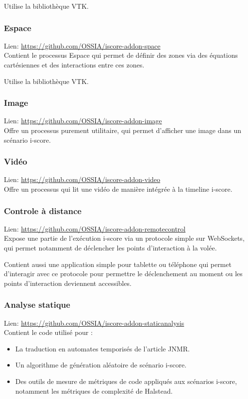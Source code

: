 \documentclass[french,a4paper,openany,12pt]{book}
\begin{document}
Utilise la bibliothèque VTK.

\subsubsection{Espace}
Lien: \url{https://github.com/OSSIA/iscore-addon-space}~\\
Contient le processus Espace qui permet de définir des zones via 
des équations cartésiennes et des interactions entre ces zones.

Utilise la bibliothèque VTK.

\subsubsection{Image}
Lien: \url{https://github.com/OSSIA/iscore-addon-image}~\\

Offre un processus purement utilitaire, qui permet d'afficher 
une image dans un scénario i-score.

\subsubsection{Vidéo}
Lien: \url{https://github.com/OSSIA/iscore-addon-video}~\\

Offre un processus qui lit une vidéo de manière intégrée à la 
timeline i-score.

\subsubsection{Controle à distance}
Lien: \url{https://github.com/OSSIA/iscore-addon-remotecontrol}~\\

Expose une partie de l'exécution i-score via un protocole simple sur WebSockets, 
qui permet notamment de déclencher les points d'interaction à la volée.

Contient aussi une application simple pour tablette ou téléphone qui permet d'interagir
avec ce protocole pour permettre le déclenchement au moment ou les points d'interaction 
deviennent accessibles.

\subsubsection{Analyse statique}
Lien: \url{https://github.com/OSSIA/iscore-addon-staticanalysis}~\\
Contient le code utilisé pour : 
\begin{itemize}
    \item La traduction en automates temporisés de l'article JNMR.
    \item Un algorithme de génération aléatoire de scénario i-score.
    \item Des outils de mesure de métriques de code appliqués aux scénarios i-score, notamment les métriques de complexité de Halstead.    
\end{itemize}
\end{document}
